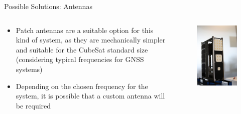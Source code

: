 \begin{frame}{Possible Solutions: Antennas}
    \begin{columns}[t]
        \begin{column}[t]{0.7\textwidth}
            \begin{itemize}
                \item Patch antennas are a suitable option for this kind of system, as they are mechanically simpler and suitable for the CubeSat standard size (considering typical frequencies for GNSS systems)
                \vspace{0.2cm}
                \item Depending on the chosen frequency for the system, it is possible that a custom antenna will be required
            \end{itemize}
        \end{column}
        \begin{column}[t]{0.3\textwidth}
            \begin{figure}[!ht]
                \begin{center}
                    \includegraphics[width=\columnwidth]{figures/x-band-patch-array}
                \end{center}
            \end{figure}
        \end{column}
    \end{columns}

\end{frame}


